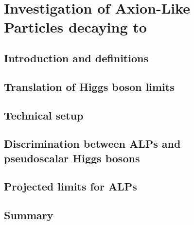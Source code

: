 \chapter{Investigation of Axion-Like Particles decaying to \ttbartitle}
\label{ch:alps}

\section{Introduction and definitions}

\section{Translation of Higgs boson limits}

\section{Technical setup}

\section{Discrimination between ALPs and pseudoscalar Higgs bosons}

\section{Projected limits for ALPs}

\section{Summary}